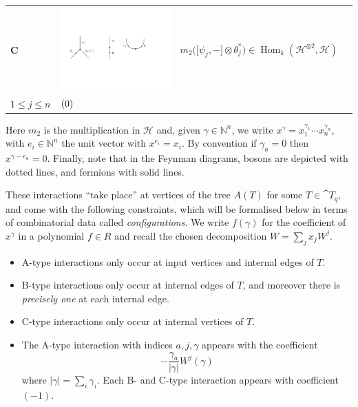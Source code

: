 \documentclass[english,letter paper,12pt,leqno]{article}
\newcommand{\tagarray}{\mbox{}\refstepcounter{equation}$(\theequation)$}
\theoremstyle{example}
\numberwithin{equation}{section}
\def\Hom{\operatorname{Hom}}
\def\be{\begin{equation}}
\def\ee{\end{equation}}
\begin{document}
\begin{center}
\begin{tabular}{ >{\centering}m{1cm} >{\centering}m{4cm} >{\centering}m{8cm} >{\centering}m{1cm}}
\textbf{C}
&
\includegraphics[scale=0.4]{dia4}
&
$m_2 \big( \big[\psi_j,-\big] \otimes \theta_j^* \big) \in \Hom_k( \mathscr{H}^{\otimes 2}, \mathscr{H} )$\\
\vspace{0.5cm}
$1 \le j \le n$
&
\tagarray{\label{interaction_3}}
\end{tabular}
\end{center}
Here $m_2$ is the multiplication in $\mathscr{H}$ and, given $\gamma \in \mathbb{N}^n$, we write $x^\gamma = x_1^{\gamma_1} \cdots x_n^{\gamma_n}$, with $e_i \in \mathbb{N}^n$ the unit vector with $x^{e_i} = x_i$. By convention if $\gamma_a = 0$ then $x^{\gamma - e_a} = 0$. Finally, note that in the Feynman diagrams, bosons are depicted with dotted lines, and fermions with solid lines.

These interactions ``take place'' at vertices of the tree $A(T)$ for some $T \in \cat{T}_q$, and come with the following constraints, which will be formalised below in terms of combinatorial data called \emph{configurations}. We write $f(\gamma)$ for the coefficient of $x^\gamma$ in a polynomial $f \in R$ and recall the chosen decomposition $W = \sum_j x_j W^j$. 

\begin{itemize}
\item A-type interactions only occur at input vertices and internal edges of $T$.
\item B-type interactions only occur at internal edges of $T$, and moreover there is \emph{precisely one} at each internal edge.
\item C-type interactions only occur at internal vertices of $T$.
\item The A-type interaction with indices $a,j, \gamma$ appears with the coefficient
\be\label{eq:coeff_a}
-\frac{\gamma_a}{|\gamma|} W^j( \gamma)
\ee
where $|\gamma| = \sum_i \gamma_i$. Each B- and C-type interaction appears with coefficient $(-1)$.
\end{itemize}
\end{document}
